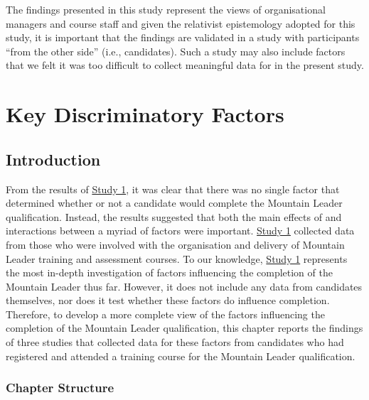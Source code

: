 \documentclass[
  12pt,
  a4paper,
]{book}
\begin{document}
The findings presented in this study represent the views of organisational managers and course staff and given the relativist epistemology adopted for this study, it is important that the findings are validated in a study with participants ``from the other side'' (i.e., candidates). Such a study may also include factors that we felt it was too difficult to collect meaningful data for in the present study.

\hypertarget{ml-pra}{%
\chapter{Key Discriminatory Factors}\label{ml-pra}}

\hypertarget{pra-introduction}{%
\section{Introduction}\label{pra-introduction}}

From the results of \protect\hyperlink{ml-qualitative}{Study 1}, it was clear that there was no single factor that determined whether or not a candidate would complete the Mountain Leader qualification. Instead, the results suggested that both the main effects of and interactions between a myriad of factors were important. \protect\hyperlink{ml-qualitative}{Study 1} collected data from those who were involved with the organisation and delivery of Mountain Leader training and assessment courses. To our knowledge, \protect\hyperlink{ml-qualitative}{Study 1} represents the most in-depth investigation of factors influencing the completion of the Mountain Leader thus far. However, it does not include any data from candidates themselves, nor does it test whether these factors do influence completion. Therefore, to develop a more complete view of the factors influencing the completion of the Mountain Leader qualification, this chapter reports the findings of three studies that collected data for these factors from candidates who had registered and attended a training course for the Mountain Leader qualification.

\hypertarget{pra-chapter-structure}{%
\subsection{Chapter Structure}\label{pra-chapter-structure}}
\end{document}
